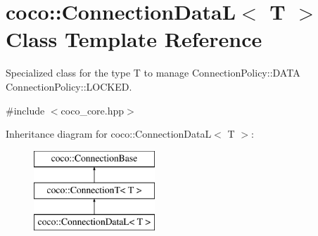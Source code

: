 \hypertarget{classcoco_1_1_connection_data_l}{}\section{coco\+:\+:Connection\+Data\+L$<$ T $>$ Class Template Reference}
\label{classcoco_1_1_connection_data_l}


Specialized class for the type T to manage Connection\+Policy\+::\+D\+A\+T\+A Connection\+Policy\+::\+L\+O\+C\+K\+E\+D.  




{\ttfamily \#include $<$coco\+\_\+core.\+hpp$>$}

Inheritance diagram for coco\+:\+:Connection\+Data\+L$<$ T $>$\+:\begin{figure}[H]
\begin{center}
\leavevmode
\includegraphics[height=3.000000cm]{classcoco_1_1_connection_data_l}
\end{center}
\end{figure}
